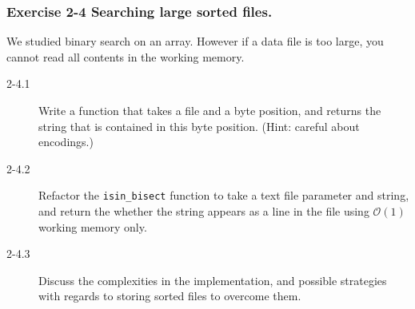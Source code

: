 \documentclass{beamer} %
\begin{document}
\begin{frame}
\frametitle{Exercise 2-4 Searching large sorted files.}

We studied binary search on an array. However if a data file is too large, you cannot read all contents in the working memory.
\begin{description}
	\item[2-4.1] Write a function that takes a file and a byte position, and returns the string that is contained in this byte position. (Hint: careful about encodings.)
	\item[2-4.2] Refactor the \texttt{isin\_bisect} function to take a text file parameter and string, and return the whether the string appears as a line in the file using $\mathcal{O}(1)$ working memory only.
	\item[2-4.3] Discuss the complexities in the implementation, and possible strategies with regards to storing sorted files to overcome them.
\end{description}

\end{frame}



\end{document}
